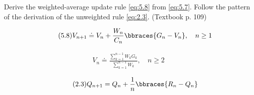 
\begin{exercise}[Exercise 5.10]

Derive the weighted-average update rule \eqref{eq:5.8} from \eqref{eq:5.7}.
Follow the pattern of the derivation of the unweighted rule \eqref{eq:2.3}.
(Textbook p. 109)

\end{exercise}


\begin{solution}

\begin{align} \label{eq:5.8} \tag{5.8}
    V_{n+1}
    \doteq
    V_n + \frac{W_n}{C_n} \bbraces{G_n - V_n},
    \quad
    n \geq 1
\end{align}

\begin{align} \label{eq:5.7} \tag{5.7}
    V_n
    \doteq
    \frac
    {
        \sum_{k=1}^{n-1} W_k G_k
    }{
        \sum_{k=1}^{n-1} W_k
    },
    \quad
    n \geq 2
\end{align}

\begin{align} \label{eq:2.3} \tag{2.3}
    Q_{n+1}
    =
    Q_n + \frac{1}{n} \bbraces{R_n - Q_n}
\end{align}
    
\end{solution}


